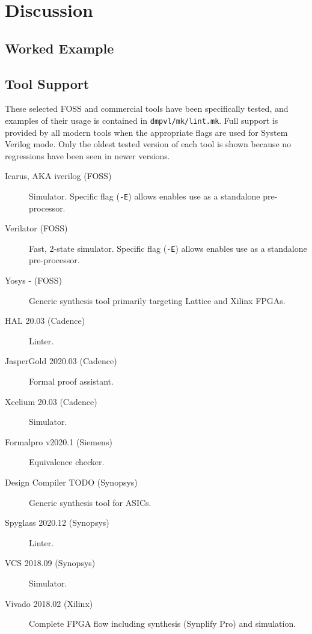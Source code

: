 \documentclass[a4paper]{article}
\begin{document}

\section{Discussion} %
\label{sec:discussion}

\subsection{Worked Example} %
\label{sec:workedExample}


\subsection{Tool Support} %
\label{sec:toolSupport}
These selected \gls{FOSS} and commercial tools have been specifically tested,
and examples of their usage is contained in \texttt{dmpvl/mk/lint.mk}.
Full support is provided by all modern tools when the appropriate flags are
used for System Verilog mode.
Only the oldest tested version of each tool is shown because no regressions
have been seen in newer versions.

\begin{description}
\item[Icarus, AKA iverilog (\gls{FOSS})]
  Simulator.
  Specific flag (\texttt{-E}) allows enables use as a standalone pre-processor.
\item[Verilator (\gls{FOSS})]
  Fast, 2-state simulator.
  Specific flag (\texttt{-E}) allows enables use as a standalone pre-processor.
\item[Yosys - (\gls{FOSS})]
  Generic synthesis tool primarily targeting Lattice and Xilinx \glspl{FPGA}.
\item[HAL 20.03 (Cadence)]
  Linter.
\item[JasperGold 2020.03 (Cadence)]
  Formal proof assistant.
\item[Xcelium 20.03 (Cadence)]
  Simulator.
\item[Formalpro v2020.1 (Siemens)]
  Equivalence checker.
\item[Design Compiler TODO (Synopsys)]
  Generic synthesis tool for \glspl{ASIC}.
\item[Spyglass 2020.12 (Synopsys)]
  Linter.
\item[VCS 2018.09 (Synopsys)]
  Simulator.
\item[Vivado 2018.02 (Xilinx)]
  Complete \gls{FPGA} flow including synthesis (Synplify Pro) and simulation.
\end{description}
\end{document}
